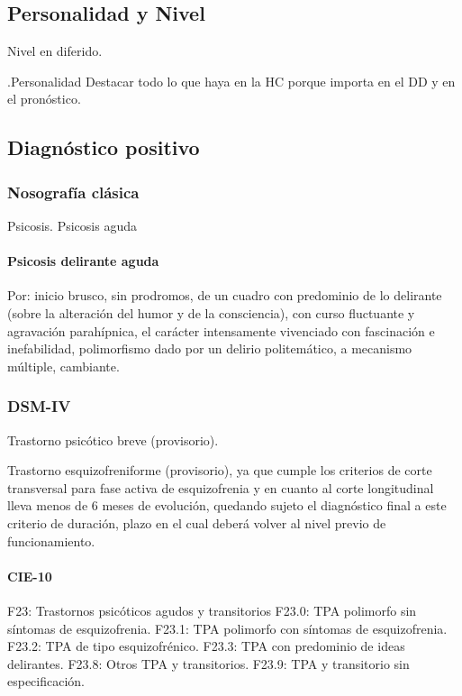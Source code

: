 \documentclass{scrbook}
\begin{document}
\subsection*{Personalidad y Nivel}

\faPaste Nivel en diferido.

.Personalidad
Destacar todo lo que haya en la HC porque importa en el DD y en el pronóstico.

\subsection*{Diagnóstico positivo}
\subsubsection*{Nosografía clásica}
\faPaste Psicosis.
\faPaste Psicosis aguda
\paragraph{Psicosis delirante aguda}
Por: inicio brusco, sin prodromos, de un cuadro con predominio de lo delirante (sobre la alteración del humor y de la consciencia), con curso fluctuante y agravación parahípnica, el carácter intensamente vivenciado con fascinación e inefabilidad, polimorfismo dado por un delirio politemático, a mecanismo múltiple, cambiante.
\subsubsection*{DSM-IV}

Trastorno psicótico breve (provisorio).

Trastorno esquizofreniforme (provisorio), ya que cumple los criterios de corte transversal para fase activa de esquizofrenia y en cuanto al corte longitudinal lleva menos de 6 meses de evolución, quedando sujeto el diagnóstico final a este criterio de duración, plazo en el cual deberá volver al nivel previo de funcionamiento.

\paragraph{CIE-10}

F23: Trastornos psicóticos agudos y transitorios
F23.0: TPA polimorfo sin síntomas de esquizofrenia.
F23.1: TPA polimorfo con síntomas de esquizofrenia.
F23.2: TPA de tipo esquizofrénico.
F23.3: TPA con predominio de ideas delirantes.
F23.8: Otros TPA y transitorios.
F23.9: TPA y transitorio sin especificación.
\end{document}
